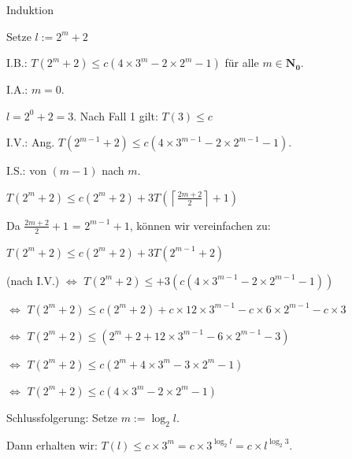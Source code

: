 \documentclass[10pt]{beamer}
\begin{document}
\begin{frame}{Induktion}

Setze $ l:= 2^m +2$

\vspace{0.4cm}

\noindent I.B.: $T( 2^m +2) \leq c (4 \times 3^m -2\times 2^m -1)$ für alle $ m \in \mathbf{N_0} $.

\vspace{0.3cm}

\noindent I.A.: $m=0$.

$l= 2^0 +2= 3$.   Nach Fall 1 gilt: $T(3) \leq c$

\vspace{0.3cm}
\noindent I.V.: Ang. $T(2^{m-1} +2) \leq c ( 4\times 3^{m-1} - 2 \times 2^{m-1} -1)$.

    
\end{frame}

    
\begin{frame}

\noindent I.S.: von $(m-1)$ nach $m$.

$T( 2^m +2) \leq c (2^m +2) +3T(\left\lceil \frac{2m+2}{2} \right\rceil +1)$

\vspace{0.2cm}
Da $\frac{2m+2}{2}  +1$ = $2^{m-1}+1$, können wir vereinfachen zu: 

\vspace{0.15cm}
$T( 2^m +2) \leq c (2^m +2) +3T ( 2^{m-1} +2)$ 

\vspace{0.15cm}
(nach I.V.) $\Leftrightarrow $ $T( 2^m +2) \leq+3( c ( 4 \times 3^{m-1} -2 \times 2^{m-1} -1))$

\vspace{0.15cm}
$\Leftrightarrow$ $T(2^m +2) \leq c (2^m +2) + c \times 12 \times 3^{m-1} - c\times 6 \times 2^{m-1} - c \times 3 $

\vspace{0.15cm}
$\Leftrightarrow$  $T(2^m +2) \leq (2^m +2 +12 \times 3^{m-1} - 6 \times 2^{m-1} -3)$

\vspace{0.15cm}

$\Leftrightarrow$ $ T(2^m +2) \leq c( 2^m + 4 \times 3^m -3 \times 2^m -1)$

$\Leftrightarrow $ $T(2^m +2) \leq c (4 \times 3^m -2 \times 2^m -1) $


\vspace{0.4cm}
\noindent Schlussfolgerung: Setze $ m:= \log_2 l $.


\noindent Dann erhalten wir: $T(l) \leq c \times 3^m = c \times 3^{\log_2 l} = c \times l^{\log_2 3} $.

    
\end{frame}
\end{document}
